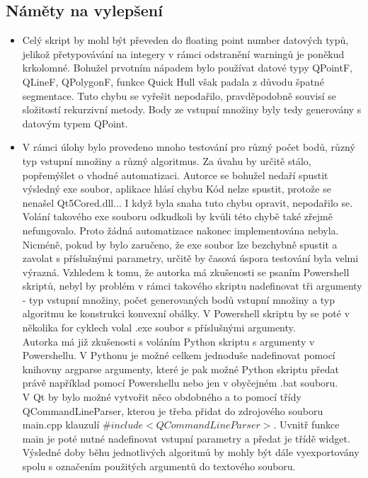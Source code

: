 \documentclass[a4paper,11pt,twoside]{article}
\begin{document}
\subsection{Náměty na vylepšení}
\large
\begin{itemize}
\item Celý skript by mohl být převeden do floating point number datových typů, jelikož přetypovávání na integery v rámci odstranění warningů je poněkud krkolomné. Bohužel prvotním nápadem bylo používat datové typy QPointF, QLineF, QPolygonF, funkce Quick Hull však padala z důvodu špatné segmentace. Tuto chybu se vyřešit nepodařilo, pravděpodobně souvisí se složitostí rekurzivní metody. Body ze vstupní množiny byly tedy generovány s datovým typem QPoint.
\item V rámci úlohy bylo provedeno mnoho testování pro různý počet bodů, různý typ vstupní množiny a různý algoritmus. Za úvahu by určitě stálo, popřemýšlet o vhodné automatizaci.  Autorce se bohužel nedaří spustit výsledný exe soubor, aplikace hlásí chybu Kód nelze spustit, protože se nenašel Qt5Cored.dll... I když byla snaha tuto chybu opravit, nepodařilo se. Volání takového exe souboru odkudkoli by kvůli této chybě také zřejmě nefungovalo. Proto žádná automatizace nakonec implementována nebyla.\\
\indent Nicméně, pokud by bylo zaručeno, že exe soubor lze bezchybně spustit a zavolat s příslušnými parametry, určitě by časová úspora testování byla velmi výrazná. Vzhledem k tomu, že autorka má zkušenosti se psaním Powershell skriptů, nebyl by problém v rámci takového skriptu nadefinovat tři argumenty - typ vstupní množiny, počet generovaných bodů vstupní množiny a typ algoritmu ke konstrukci konvexní obálky. V Powershell skriptu by se poté v několika for cyklech volal .exe soubor s příslušnými argumenty.\\
\indent Autorka má již zkušenosti s voláním Python skriptu s argumenty v Powershellu. V Pythonu je možné celkem jednoduše nadefinovat pomocí knihovny argparse argumenty, které je pak možné Python skriptu předat právě například pomocí Powershellu nebo jen v obyčejném .bat souboru. \\
\indent V Qt by bylo možné vytvořit něco obdobného a to pomocí třídy QCommandLineParser, kterou je třeba přidat do zdrojového souboru main.cpp klauzulí \textit{$\#include <QCommandLineParser>$}. Uvnitř funkce main je poté nutné nadefinovat vstupní parametry a předat je třídě widget. Výsledné doby běhu jednotlivých algoritmů by mohly být dále vyexportovány spolu s označením použitých argumentů do textového souboru.
\end{itemize}
 

\newpage
\vspace*{-6ex}
\renewcommand{\refname}{Literatura} 
    
    
 
\end{document}
